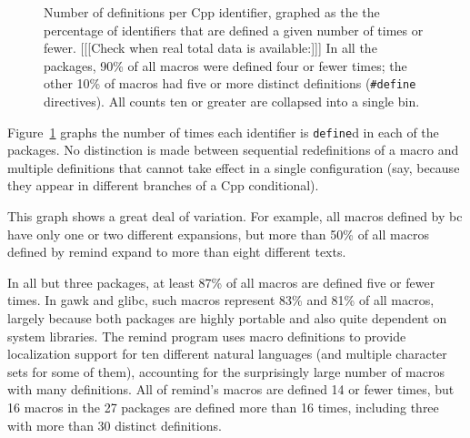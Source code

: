\documentclass[11pt]{article}
\def\numpackages{27}
\begin{document}


\begin{figure}
\centerline{}
\caption{Number of definitions per Cpp identifier, graphed as the
  the percentage of identifiers that are defined a given number of times
  or fewer.  [[[Check when real total data is available:]]] 
  In all the packages, 90\% of all macros were defined four or
  fewer times; the other 10\% of macros had five or more distinct
  definitions ({\tt \#define} directives).  All counts ten or greater are
  collapsed into a single bin.}
\label{fig:freq-def}
\end{figure}

Figure~\ref{fig:freq-def} graphs the number of times each identifier is
{\tt define}d in each of the packages.  No distinction is made between
sequential redefinitions of a macro and multiple definitions that cannot
take effect in a single configuration (say, because they appear in
different branches of a Cpp conditional).

This graph shows a great deal of variation.  For example, all macros
defined by bc have only one or two different expansions, but more than 50\%
of all macros defined by remind expand to more than eight different texts.

In all but three packages, at least 87\% of all macros are defined five or
fewer times.  In gawk and glibc, such macros represent 83\% and 81\% of all
macros, largely because both packages are highly portable and also quite
dependent on system libraries.  The remind program uses macro definitions
to provide localization support for ten different natural languages (and
multiple character sets for some of them), accounting for the surprisingly
large number of macros with many definitions.  All of remind's macros are
defined 14 or fewer times, but 16 macros in the {\numpackages} packages are
defined more than 16 times, including three with more than 30 distinct
definitions.
\end{document}
